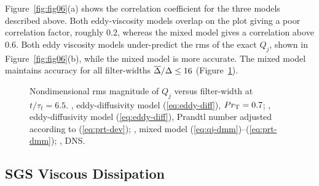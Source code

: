 \documentclass[tcfd]{svjour}
\begin{document}
Figure~\ref{fig:fig06}(a) shows the correlation coeff\/icient for the three models
described above. Both eddy-viscosity models overlap on the plot
giving a poor correlation factor, roughly 0.2, whereas the mixed model
gives a correlation above 0.6. Both eddy viscosity models
under-predict the rms of the exact $Q_j$, shown in Figure~\ref{fig:fig06}(b), while the
mixed model is more accurate.
The mixed model maintains accuracy for all f\/ilter-widths
$\overline{\Delta}/\Delta\leq16$ (Figure~\ref{fig:fig07}).

\begin{figure}[t]
\vspace{45mm}%
\caption{Nondimensional rms magnitude of $Q_j$ versus f\/ilter-width
at $t/\tau_t=6.5$. \solid, eddy-diffusivity model (\protect\ref{eq:eddy-diff}), $Pr_{\rm
T}=0.7$; \dashed, eddy-diffusivity model (\protect\ref{eq:eddy-diff}), Prandtl number adjusted
according to (\protect\ref{eq:prt-dev}); \chndot, mixed model
(\protect\ref{eq:qj-dmm})--(\protect\ref{eq:prt-dmm}); \trian, DNS.}
\label{fig:fig07}
\end{figure}


\subsection{SGS Viscous Dissipation}
\label{sec:5.2}
\end{document}
